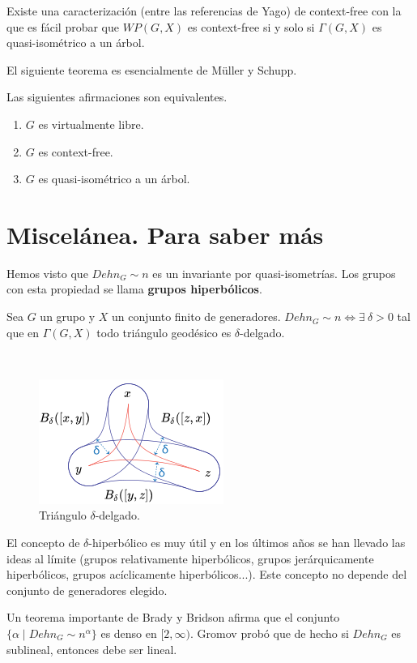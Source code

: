 \documentclass[twoside, 11pt]{article}
\begin{document}
Existe una caracterización (entre las referencias de Yago) de context-free con la que es fácil probar que $WP(G,X)$ es context-free si y solo si $\Gamma(G,X)$ es quasi-isométrico a un árbol. 

El siguiente teorema es esencialmente de Müller y Schupp. 

\begin{teorema}
Las siguientes afirmaciones son equivalentes.
\begin{enumerate}
\item $G$ es virtualmente libre.
\item $G$ es context-free.
\item $G$ es quasi-isométrico a un árbol.
\end{enumerate}
\end{teorema}

\section{Miscelánea. Para saber más}
Hemos visto que $Dehn_G\sim n$ es un invariante por quasi-isometrías. Los grupos con esta propiedad se llama \textbf{grupos hiperbólicos}.
\begin{teorema}
Sea $G$ un grupo y $X$ un conjunto finito de generadores. $Dehn_G\sim n\Leftrightarrow \exists\ \delta>0$ tal que en $\Gamma(G,X)$ todo triángulo geodésico es $\delta$-delgado. 
\end{teorema}\

\begin{figure}[h!]
\includegraphics[scale=0.8]{delgado}
\caption{Triángulo $\delta$-delgado.}
\end{figure}

El concepto de $\delta$-hiperbólico es muy útil y en los últimos años se han llevado las ideas al límite (grupos relativamente hiperbólicos, grupos jerárquicamente hiperbólicos, grupos acíclicamente hiperbólicos...). Este concepto no depende del conjunto de generadores elegido.

Un teorema importante de Brady y Bridson afirma que el conjunto $\{\alpha\mid Dehn_G\sim n^{\alpha}\}$ es denso en $[2,\infty)$. Gromov probó que de hecho si $Dehn_G$ es sublineal, entonces debe ser lineal. 
\end{document}
